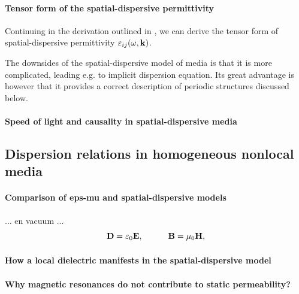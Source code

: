 \paragraph{Tensor form of the spatial-dispersive permittivity}%
Continuing in the derivation outlined in \cite{landau1984electrodynamics, krowne2007book_agran, agranovich2006spatial}, we can derive the tensor form of spatial-dispersive permittivity $\varepsilon_{ij}(\omega,{\mathbf{k}})$.

The downsides of the spatial-dispersive model of media is that it is more complicated, leading e.g. to implicit dispersion equation. Its great advantage is however that it provides a correct description of periodic structures discussed below. 
\mdf{ TODO REF EBD theory and nonlocal electrodynamics %
\cite{krowne2007book_agran}
\cite{landau1984electrodynamics}
\cite{agranovich2006spatial}
\cite{mikki2009electromagnetic}
\cite{vinogradov2002form}
\cite{golubkov1995boundary}
\cite{agranovich2004linear}
\cite{agranovich1962crystal}
}
\paragraph{Speed of light and causality in spatial-dispersive media}%

\subsection{Dispersion relations in homogeneous nonlocal media} %
\paragraph{Comparison of eps-mu and spatial-dispersive models}%
... en vacuum ...
\begin{equation}		\mathbf{D} = \varepsilon_0	\mathbf{E}, \quad\quad\quad						\mathbf{B} = \mu_0			\mathbf{H},				 \label{eq_ce_dispersive}\end{equation}
\paragraph{How a local dielectric manifests in the spatial-dispersive model}  %
\paragraph{Why magnetic resonances do not contribute to static permeability?}%
